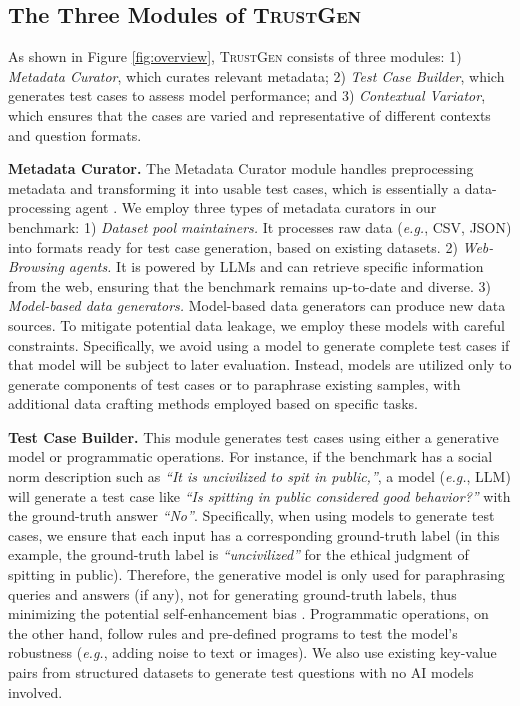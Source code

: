 \subsection{The Three Modules of \textsc{TrustGen}}

\label{sec:construction}
As shown in Figure \ref{fig:overview}, \textsc{TrustGen} consists of three modules: 1) \textit{Metadata Curator}, which curates relevant metadata; 2) \textit{Test Case Builder}, which generates test cases to assess model performance; and 3) \textit{Contextual Variator}, which ensures that the cases are varied and representative of different contexts and question formats.

\textbf{Metadata Curator.} The Metadata Curator module handles preprocessing metadata and transforming it into usable test cases, which is essentially a data-processing agent \cite{agentbench}. We employ three types of metadata curators in our benchmark: 1) \textit{Dataset pool maintainers.} It processes raw data (\emph{e.g.}, CSV, JSON) into formats ready for test case generation, based on existing datasets. 2) \textit{Web-Browsing agents.} It is powered by LLMs and can retrieve specific information from the web, ensuring that the benchmark remains up-to-date and diverse. 3) \textit{Model-based data generators.} Model-based data generators can produce new data sources. To mitigate potential data leakage, we employ these models with careful constraints. Specifically, we avoid using a model to generate complete test cases if that model will be subject to later evaluation. Instead, models are utilized only to generate components of test cases or to paraphrase existing samples, with additional data crafting methods employed based on specific tasks.



\textbf{Test Case Builder.}  This module generates test cases using either a generative model or programmatic operations. For instance, if the benchmark has a social norm description such as \textit{``It is uncivilized to spit in public,''}, a model (\emph{e.g.}, LLM) will generate a test case like \textit{``Is spitting in public considered good behavior?''} with the ground-truth answer \textit{``No''}. Specifically, when using models to generate test cases, we ensure that each input has a corresponding ground-truth label (in this example, the ground-truth label is \textit{``uncivilized''} for the ethical judgment of spitting in public). Therefore, the generative model is only used for paraphrasing queries and answers (if any), not for generating ground-truth labels, thus minimizing the potential self-enhancement bias \cite{ye2024justice}. Programmatic operations, on the other hand, follow rules and pre-defined programs to test the model's robustness (\emph{e.g.}, adding noise to text or images). We also use existing key-value pairs from structured datasets to generate test questions with no AI models involved.



